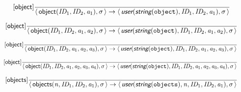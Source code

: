 \documentclass[10pt,leqno]{article}
\newcommand{\artVariable}[1]{\mbox{\em #1\/}}
\newcommand{\artConstructor}[1]{\mbox{\sf #1}}
\newcommand{\artCaseInsensitiveLiteral}[1]{\mbox{\tt #1}}
\newcommand{\artSpecial}[1]{\mbox{\sf\em #1}}
\begin{document}
\begin{equation}
\tag*{[\artConstructor{\sf object}]}\frac{}{\langle\, \artConstructor{\sf object}(\artVariable{ID$_{1}$}, \artVariable{ID$_{2}$}, \artVariable{a$_{1}$}), \artVariable{$\sigma$}\,\rangle \rightarrow \langle\, \artSpecial{user}(\artSpecial{string}(\artCaseInsensitiveLiteral{object}), \artVariable{ID$_{1}$}, \artVariable{ID$_{2}$}, \artVariable{a$_{1}$}), \artVariable{$\sigma$}\,\rangle }
\end{equation}

\begin{equation}
\tag*{[\artConstructor{\sf object}]}\frac{}{\langle\, \artConstructor{\sf object}(\artVariable{ID$_{1}$}, \artVariable{ID$_{2}$}, \artVariable{a$_{1}$}, \artVariable{a$_{2}$}), \artVariable{$\sigma$}\,\rangle \rightarrow \langle\, \artSpecial{user}(\artSpecial{string}(\artCaseInsensitiveLiteral{object}), \artVariable{ID$_{1}$}, \artVariable{ID$_{2}$}, \artVariable{a$_{1}$}, \artVariable{a$_{2}$}), \artVariable{$\sigma$}\,\rangle }
\end{equation}

\begin{equation}
\tag*{[\artConstructor{\sf object}]}\frac{}{\langle\, \artConstructor{\sf object}(\artVariable{ID$_{1}$}, \artVariable{ID$_{2}$}, \artVariable{a$_{1}$}, \artVariable{a$_{2}$}, \artVariable{a$_{3}$}), \artVariable{$\sigma$}\,\rangle \rightarrow \langle\, \artSpecial{user}(\artSpecial{string}(\artCaseInsensitiveLiteral{object}), \artVariable{ID$_{1}$}, \artVariable{ID$_{2}$}, \artVariable{a$_{1}$}, \artVariable{a$_{2}$}, \artVariable{a$_{3}$}), \artVariable{$\sigma$}\,\rangle }
\end{equation}

\begin{equation}
\tag*{[\artConstructor{\sf object}]}\frac{}{\langle\, \artConstructor{\sf object}(\artVariable{ID$_{1}$}, \artVariable{ID$_{2}$}, \artVariable{a$_{1}$}, \artVariable{a$_{2}$}, \artVariable{a$_{3}$}, \artVariable{a$_{4}$}), \artVariable{$\sigma$}\,\rangle \rightarrow \langle\, \artSpecial{user}(\artSpecial{string}(\artCaseInsensitiveLiteral{object}), \artVariable{ID$_{1}$}, \artVariable{ID$_{2}$}, \artVariable{a$_{1}$}, \artVariable{a$_{2}$}, \artVariable{a$_{3}$}, \artVariable{a$_{4}$}), \artVariable{$\sigma$}\,\rangle }
\end{equation}

\begin{equation}
\tag*{[\artConstructor{\sf objects}]}\frac{}{\langle\, \artConstructor{\sf objects}(\artVariable{n}, \artVariable{ID$_{1}$}, \artVariable{ID$_{2}$}, \artVariable{a$_{1}$}), \artVariable{$\sigma$}\,\rangle \rightarrow \langle\, \artSpecial{user}(\artSpecial{string}(\artCaseInsensitiveLiteral{objects}), \artVariable{n}, \artVariable{ID$_{1}$}, \artVariable{ID$_{2}$}, \artVariable{a$_{1}$}), \artVariable{$\sigma$}\,\rangle }
\end{equation}
\end{document}
